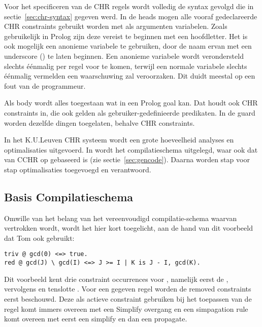 Voor het specificeren van de CHR regels wordt volledig de syntax gevolgd die in sectie~\ref{sec:chr-syntax} gegeven werd. In de heads mogen alle vooraf gedeclareerde CHR constraints gebruikt worden met als argumenten variabelen. Zoals gebruikelijk in Prolog zijn deze vereist te beginnen met een hoofdletter. Het is ook mogelijk een anonieme variabele te gebruiken, door de naam ervan met een underscore (\code{\_}) te laten beginnen. Een anonieme variabele wordt verondersteld slechts \'e\'enmalig per regel voor te komen, terwijl een normale variabele slechts \'e\'enmalig vermelden een waarschuwing zal veroorzaken. Dit duidt meestal op een fout van de programmeur.

Als body wordt alles toegestaan wat in een Prolog goal kan. Dat houdt ook CHR constraints in, die ook gelden als gebruiker-gedefinieerde predikaten. In de guard worden dezelfde dingen toegelaten, behalve CHR constraints.

In het K.U.Leuven CHR systeem wordt een grote hoeveelheid analyses en optimalisaties uitgevoerd. In \cite{tomsphdthesis} wordt het compilatieschema uitgelegd, waar ook dat van CCHR op gebaseerd is (zie sectie~\ref{sec:gencode}). Daarna worden stap voor stap optimalisaties toegevoegd en verantwoord. 

\subsection{Basis Compilatieschema} \label{sec:schema}

Omwille van het belang van het vereenvoudigd compilatie-schema waarvan vertrokken wordt, wordt het hier kort toegelicht, aan de hand van dit voorbeeld dat Tom ook gebruikt: \begin{Verbatim}[frame=single]
triv @ gcd(0) <=> true.
red @ gcd(J) \ gcd(I) <=> J >= I | K is J - I, gcd(K).
\end{Verbatim}

Dit voorbeeld kent drie constraint occurrences voor , namelijk eerst de , vervolgens  en tenslotte . Voor een gegeven regel worden de removed constraints eerst beschouwd. Deze als actieve constraint gebruiken bij het toepassen van de regel komt immers overeen met een Simplify overgang en een simpagation rule komt overeen met eerst een simplify en dan een propagate.

